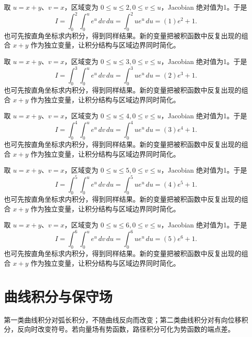 \documentclass[12pt,fontset=fandol]{ctexart}
\begin{document}
\begin{solve}\label{ans:c40q20}
取 $u=x+y$、$v=x$，区域变为 $0\le u\le 2,0\le v\le u$，Jacobian 绝对值为1。于是
\[
I=\int_0^{2}\int_0^ue^u\,dv\,du=\int_0^{2}ue^u\,du=(1)e^{2}+1.
\]
也可先按直角坐标求内积分，得到同样结果。新的变量把被积函数中反复出现的组合 $x+y$ 作为独立变量，让积分结构与区域边界同时简化。
\end{solve}

\begin{solve}\label{ans:c40q21}
取 $u=x+y$、$v=x$，区域变为 $0\le u\le 3,0\le v\le u$，Jacobian 绝对值为1。于是
\[
I=\int_0^{3}\int_0^ue^u\,dv\,du=\int_0^{3}ue^u\,du=(2)e^{3}+1.
\]
也可先按直角坐标求内积分，得到同样结果。新的变量把被积函数中反复出现的组合 $x+y$ 作为独立变量，让积分结构与区域边界同时简化。
\end{solve}

\begin{solve}\label{ans:c40q22}
取 $u=x+y$、$v=x$，区域变为 $0\le u\le 4,0\le v\le u$，Jacobian 绝对值为1。于是
\[
I=\int_0^{4}\int_0^ue^u\,dv\,du=\int_0^{4}ue^u\,du=(3)e^{4}+1.
\]
也可先按直角坐标求内积分，得到同样结果。新的变量把被积函数中反复出现的组合 $x+y$ 作为独立变量，让积分结构与区域边界同时简化。
\end{solve}

\begin{solve}\label{ans:c40q23}
取 $u=x+y$、$v=x$，区域变为 $0\le u\le 5,0\le v\le u$，Jacobian 绝对值为1。于是
\[
I=\int_0^{5}\int_0^ue^u\,dv\,du=\int_0^{5}ue^u\,du=(4)e^{5}+1.
\]
也可先按直角坐标求内积分，得到同样结果。新的变量把被积函数中反复出现的组合 $x+y$ 作为独立变量，让积分结构与区域边界同时简化。
\end{solve}

\begin{solve}\label{ans:c40q24}
取 $u=x+y$、$v=x$，区域变为 $0\le u\le 6,0\le v\le u$，Jacobian 绝对值为1。于是
\[
I=\int_0^{6}\int_0^ue^u\,dv\,du=\int_0^{6}ue^u\,du=(5)e^{6}+1.
\]
也可先按直角坐标求内积分，得到同样结果。新的变量把被积函数中反复出现的组合 $x+y$ 作为独立变量，让积分结构与区域边界同时简化。
\end{solve}

\clearpage
\section{曲线积分与保守场}\label{sec:ch41}
第一类曲线积分对弧长积分，不随曲线反向而改变；第二类曲线积分对有向位移积分，反向时改变符号。若向量场有势函数，路径积分可化为势函数的端点差。
\end{document}

